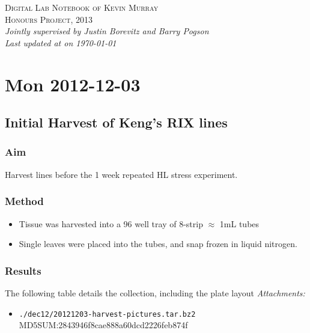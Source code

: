 \documentclass[12pt,a4paper]{book}
\begin{document}
\setlength{\parindent}{0cm}

\begin{titlepage}
  \begin{center}
    \textsc{\LARGE Digital Lab Notebook of Kevin Murray}\\[1.5cm]
    \textsc{\Large Honours Project, 2013}\\[0.5cm]
    \textit{Jointly supervised by Justin Borevitz and Barry Pogson}\\
    \vfill
    \textit{Last updated at \currenttime on \today}\\
  \end{center}
\end{titlepage}

\chapter*{Mon 2012-12-03}
  \section*{Initial Harvest of Keng's RIX lines}
    \subsection*{Aim}
      Harvest lines before the 1 week repeated HL stress experiment.
    \subsection*{Method}
      \begin{itemize} \itemsep1pt \parskip0pt 
        \item Tissue was harvested into a 96 well tray of 8-strip $\approx$ 1mL tubes
        \item Single leaves were placed into the tubes, and snap frozen in liquid nitrogen.
      \end{itemize}
    \subsection*{Results}
      The following table details the collection, including the plate layout
      \emph{Attachments:}
      \begin{itemize} \itemsep1pt \parskip0pt 
        \item \verb+./dec12/20121203-harvest-pictures.tar.bz2+ \hfill
          MD5SUM:2843946f8cae888a60dcd2226feb874f
      \end{itemize}
\end{document}
